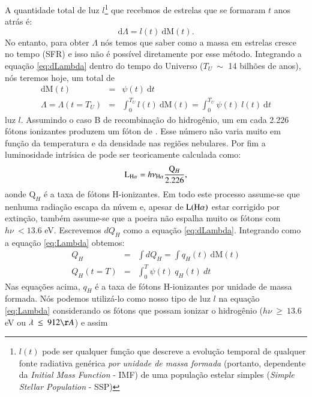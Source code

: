 A quantidade total de luz $l$\footnote{$l(t)$ pode ser qualquer função que descreve a evolução
temporal de qualquer fonte radiativa genérica \emph{por unidade de massa formada} (portanto,
dependente da {\em Initial Mass Function} - IMF) de uma população estelar simples ({\em Simple
Stellar Population} - SSP)} que recebmos de estrelas que se formaram $t$ anos atrás é:
\begin{equation}
	\mathrm{d}\Lambda = l(t)\ \mathrm{d}\mathrm{M}(t).
	\label{eq:dLambda}
\end{equation}
\noindent No entanto, para obter $\Lambda$ nós temos que saber como a massa em estrelas cresce no
tempo (SFR) e isso não é possível diretamente por esse método. Integrando a equação
\eqref{eq:dLambda} dentro do tempo do Universo ($T_U\ \sim$ 14 bilhões de anos), nós teremos hoje,
um total de
\begin{eqnarray}
	\mathrm{d}\mathrm{M}(t) &=& \psi(t)\ \mathrm{d}t \\
	\Lambda = \Lambda(t = T_U) &=& \int_0^{T_U} l(t)\ \textrm{d}\textrm{M}(t) = \int_0^{T_U} \psi(t)\
	l(t)\ \textrm{d}t
	\label{eq:Lambda}
\end{eqnarray}
\noindent luz $l$. Assumindo o caso B de recombinação do hidrogênio, um em cada 2.226 fótons
ionizantes produzem um fóton de \Halpha \citep{Osterbrock.Ferland.2006a}. Esse número não varia
muito em função da temperatura e da densidade nas regiões nebulares. Por fim a luminosidade
intrísica de \Halpha pode ser teoricamente calculada como:
\begin{equation}
	\LHalpha = h \nu_{\Halpha} \frac{\mathrm{Q}_H}{2.226},
	\label{eq:LHa_recomb_theory}
\end{equation}
\noindent aonde $\mathrm{Q}_H$ é a taxa de fótons H-ionizantes. Em todo este processo
assume-se que nenhuma radiação escapa da núvem e, apesar de $\mathrm{L}(\Halpha)$ estar corrigido
por extinção, também assume-se que a poeira não espalha muito os fótons com $h\nu\ < 13.6$ eV.
Escrevemos $dQ_H$ como a equação \eqref{eq:dLambda}. Integrando como a equação \eqref{eq:Lambda}
obtemos:
\begin{eqnarray}
	Q_H &=& \int dQ_H = \int q_H(t)\ \mathrm{d}\mathrm{M}(t) \\ 
	Q_H(t = T) &=& \int_0^T \psi(t)\ q_H(t)\ dt
	\label{eq:QH}
\end{eqnarray}
\noindent Nas equações acima, $q_H$ é a taxa de fótons H-ionizantes por unidade de massa formada.
Nós podemos utilizá-lo como nosso tipo de luz $l$ na equação \eqref{eq:Lambda} considerando os
fótons que possam ionizar o hidrogênio ($h\nu\ \geq\ 13.6$ eV ou $\lambda\ \leq\ 912\AA$) e assim
